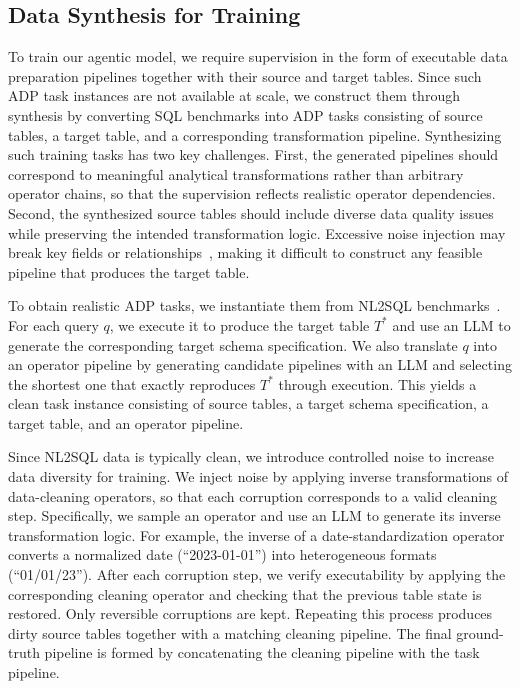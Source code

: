 \subsection{Data Synthesis for Training}
\label{subsec:data_synthesis}
To train our agentic model, we require supervision in the form of executable data preparation pipelines together with their source and target tables. Since such ADP task instances are not available at scale, we construct them through synthesis by converting SQL benchmarks into ADP tasks consisting of source tables, a target table, and a corresponding transformation pipeline.
%
Synthesizing such training tasks has two key challenges. First, the generated pipelines should correspond to meaningful analytical transformations rather than arbitrary operator chains, so that the supervision reflects realistic operator dependencies. Second, the synthesized source tables should include diverse data quality issues while preserving the intended transformation logic. Excessive noise injection may break key fields or relationships~\cite{rekatsinas2017holoclean}, making it difficult to construct any feasible pipeline that produces the target table.

To obtain realistic ADP tasks, we instantiate them from NL2SQL benchmarks~\cite{spider_dataset,bird_dataset}.
For each query $q$, we execute it to produce the target table $T^*$ and use an LLM to generate the corresponding target schema specification. We also translate $q$ into an operator pipeline by generating candidate pipelines with an LLM and selecting the shortest one that exactly reproduces $T^*$ through execution. This yields a clean task instance consisting of source tables, a target schema specification, a target table, and an operator pipeline.

Since NL2SQL data is typically clean, we introduce controlled noise to increase data diversity for training. We inject noise by applying inverse transformations of data-cleaning operators, so that each corruption corresponds to a valid cleaning step. Specifically, we sample an operator and use an LLM to generate its inverse transformation logic. For example, the inverse of a date-standardization operator converts a normalized date (\eg ``2023-01-01'') into heterogeneous formats (\eg ``01/01/23''). After each corruption step, we verify executability by applying the corresponding cleaning operator and checking that the previous table state is restored. Only reversible corruptions are kept. Repeating this process produces dirty source tables together with a matching cleaning pipeline. The final ground-truth pipeline is formed by concatenating the cleaning pipeline with the task pipeline.
